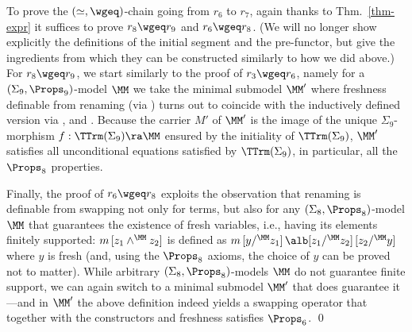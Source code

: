 To prove the $(\simeq,\wgeq)$-chain going from $r_{6}$ to $r_7$, 
%
again thanks to Thm.~\ref{thm-expr}   
it suffices to prove 
$r_8 \wgeq r_9$ and 
$r_6 \wgeq r_8$. (We will no longer show explicitly the definitions of the initial segment and the pre-functor, but give the ingredients from which they can be constructed similarly to how we did above.)
%
%
For 
	$r_8\wgeq r_9$, we 
start similarly to the proof of $r_3 \wgeq r_6$, namely for a 
$(\Sigma_{9},\Props_{9})$-model $\MM$ 
we take the 
minimal submodel $\MM'$ where freshness definable from renaming (via \FrDRn{}) turns out to coincide 
with the inductively defined version via \FrVr{}, \FrAp{} and \FrLm{}. 
Because the carrier $M'$ of $\MM'$ is the image of the unique 
$\Sigma_{9}$-morphism 
$f: \TTrm(\Sigma_{9}) \ra \MM$ 
ensured by the initiality of  
$\TTrm(\Sigma_{9})$, $\MM'$ satisfies all unconditional equations satisfied 
by $\TTrm(\Sigma_{9})$, in particular, all the $\Props_8$ properties. 
%
%
%
%

Finally, the proof of 
	$r_6 \wgeq r_8$ exploits the observation that renaming is definable from swapping 
not only for terms, but also for any $(\Sigma_8,\Props_8)$-model $\MM$ that guarantees the existence of fresh 
variables, %
i.e., having its elements finitely supported: $m\,[z_1 \wedge^{\MM} z_2]$ is defined as $
m\,[y /^{\MM} z_1]\,\alb[z_1 /^{\MM} z_2]\,[z_2 /^{\MM} y]
$ where $y$ is fresh (and, using the $\Props_8$ axioms, the choice of $y$ can be proved not to matter). 
While arbitrary $(\Sigma_8,\Props_8)$-models $\MM$ do not guarantee finite support, we can again switch to a minimal 
submodel $\MM'$ that does guarantee it---and in $\MM'$ the above definition indeed yields a swapping operator that together with 
the constructors and freshness 
satisfies $\Props_6$.  
% 
%
\qed
{}
\medskip

